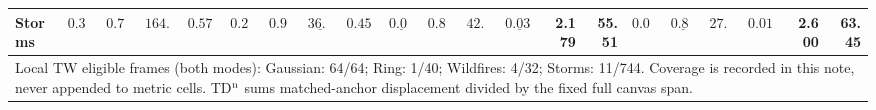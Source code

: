 \begin{table}[t]
{\begin{tabular}{lrrrrrrrrrrrrrrrrrrrr}
Storms & $0.340$ & $0.710$ & $164.14$ & $0.5753$ & $0.210$ & $\mathbf{0.940}$ & $\underline{36.24}$ & $0.4579$ & $\underline{0.079}$ & $0.846$ & $42.38$ & $\underline{0.0399}$ & 2.179 & 55.51 & $\mathbf{0.074}$ & $\underline{0.877}$ & $\mathbf{27.29}$ & $\mathbf{0.0140}$ & 2.600 & 63.45 \\
\midrule
\multicolumn{21}{p{\dimexpr\textwidth-3pt\relax}}{Local TW eligible frames (both modes): Gaussian: 64/64; Ring: 1/40; Wildfires: 4/32; Storms: 11/744. Coverage is recorded in this note, never appended to metric cells. TD$^{\rm n}$ sums matched-anchor displacement divided by the fixed full canvas span.} \\
\bottomrule
\end{tabular}
}
\end{table}
